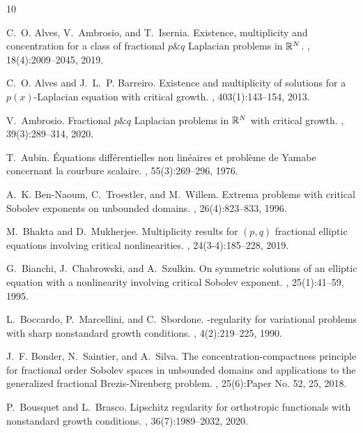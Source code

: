 \documentclass[11pt]{amsart}
\theoremstyle{plain}
\theoremstyle{definition}
\numberwithin{equation}{section}
\begin{document}
\begin{thebibliography}{10}

C.~O. Alves, V.~Ambrosio, and T.~Isernia.
\newblock Existence, multiplicity and concentration for a class of fractional
  {$p\&q$} {L}aplacian problems in {$\Bbb R^N$}.
, 18(4):2009--2045, 2019.

C.~O. Alves and J.~L.~P. Barreiro.
\newblock Existence and multiplicity of solutions for a {$p(x)$}-{L}aplacian
  equation with critical growth.
, 403(1):143--154, 2013.

V.~Ambrosio.
\newblock Fractional {$p\&q$} {L}aplacian problems in {$\Bbb{R}^N$} with
  critical growth.
, 39(3):289--314, 2020.

T.~Aubin.
\newblock \'{E}quations diff\'{e}rentielles non lin\'{e}aires et probl\`eme de
  {Y}amabe concernant la courbure scalaire.
, 55(3):269--296, 1976.

A.~K. Ben-Naoum, C.~Troestler, and M.~Willem.
\newblock Extrema problems with critical {S}obolev exponents on unbounded
  domains.
, 26(4):823--833, 1996.

M.~Bhakta and D.~Mukherjee.
\newblock Multiplicity results for {$(p,q)$} fractional elliptic equations
  involving critical nonlinearities.
, 24(3-4):185--228, 2019.

G.~Bianchi, J.~Chabrowski, and A.~Szulkin.
\newblock On symmetric solutions of an elliptic equation with a nonlinearity
  involving critical {S}obolev exponent.
, 25(1):41--59, 1995.

L.~Boccardo, P.~Marcellini, and C.~Sbordone.
-regularity for variational problems with sharp
  nonstandard growth conditions.
, 4(2):219--225, 1990.

J.~F. Bonder, N.~Saintier, and A.~Silva.
\newblock The concentration-compactness principle for fractional order
  {S}obolev spaces in unbounded domains and applications to the generalized
  fractional {B}rezis-{N}irenberg problem.
, 25(6):Paper No.
  52, 25, 2018.

P.~Bousquet and L.~Brasco.
\newblock Lipschitz regularity for orthotropic functionals with nonstandard
  growth conditions.
, 36(7):1989--2032, 2020.


\end{thebibliography}
\end{document}
